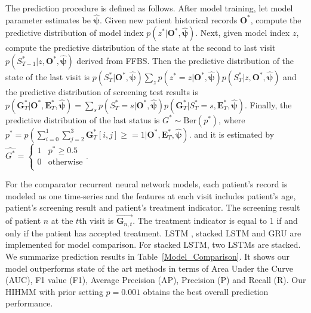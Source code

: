 \documentclass{article}
\begin{document}
The prediction procedure is defined as follows. After model training, let model parameter estimates be $\hat{\bm \psi}$. Given new patient historical records $\bm O^*$, compute the predictive distribution of model index $p(z^*|\bm O^*, \hat{\bm \psi})$. Next, given model index $z$, compute the predictive distribution of the state at the second to last visit
$p(S^*_{T-1}|z, \bm O^*, \hat{\bm \psi})$ derived from FFBS. Then the predictive distribution of the state of the last visit is 
$p(S^*_{T}|\bm O^*, \hat{\bm \psi}) \sum_{z} p(z^* = z|\bm O^*, \hat{\bm \psi}) p(S^*_{T}|z, \bm O^*, \hat{\bm \psi})$ and the predictive distribution of screening test results is $p(\bm G^*_{T}| \bm O^*, \bm E^*_T, \hat{\bm \psi}) = \sum_s p(S^*_{T} = s|\bm O^*, \hat{\bm \psi}) p(\bm G^*_{T}| S_{T}^* = s, \bm E_{T}^*, \hat{\bm \psi})$. Finally, the predictive distribution of the last status is $G^* \sim \mathrm{Ber}\left( p^* \right)$, where $p^* = p\left(\sum_{i = 0}^{1}\sum_{j = 2}^3 \bm G_{T}^*[i,j] \geq = 1 |  \bm O^*, \bm E^*_T, \hat{\bm \psi}\right)$. and it is estimated by $\hat{G^*} = \begin{cases}
1 & p^* \geq 0.5 \\
0 & \mathrm{otherwise} \\
\end{cases}$.

For the comparator recurrent neural network models, each patient's record is modeled as one time-series and the features at each visit includes patient's age, patient's screening result and patient's treatment indicator. The screening result of patient $n$ at the $t$th visit is $\vec{\bm G_{n,t}}$. The treatment indicator is equal to 1 if and only if the patient has accepted treatment. LSTM \citep{Cho_2014}, stacked LSTM \citep{Dyer_2015} and GRU \citep{Chung_2014} are implemented for model comparison. For stacked LSTM, two LSTMs are stacked. We summarize prediction results in Table~\ref{Model_Comparison}. It shows our model outperforms state of the art methods in terms of Area Under the Curve (AUC), F1 value (F1), Average Precision (AP), Precision (P) and Recall (R). Our HIHMM with prior setting $p = 0.001$ obtains the best overall prediction performance.
\end{document}
